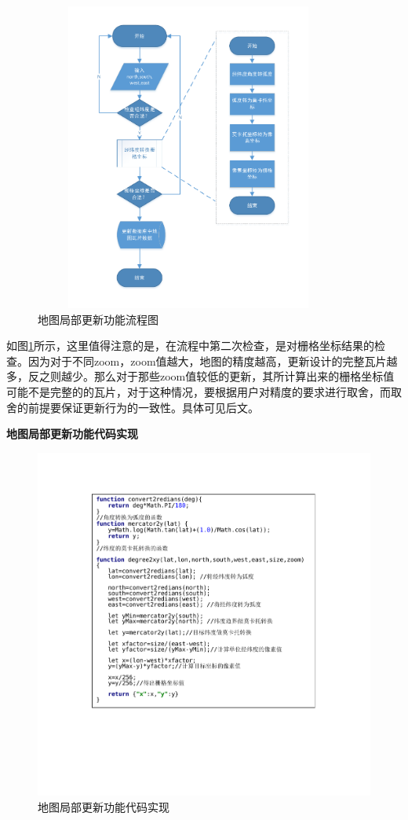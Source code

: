 \begin{figure}[H]
  \centering
  \includegraphics[width=4in,height=4in]{new_FIGs/chapter4/update_tile_1.pdf}
  \caption{地图局部更新功能流程图}\label{update_tile_1}
\end{figure}
如图\ref{update_tile_1}所示，这里值得注意的是，在流程中第二次检查，是对栅格坐标结果的检查。因为对于不同zoom，zoom值越大，地图的精度越高，更新设计的完整瓦片越多，反之则越少。那么对于那些zoom值较低的更新，其所计算出来的栅格坐标值可能不是完整的的瓦片，对于这种情况，要根据用户对精度的要求进行取舍，而取舍的前提要保证更新行为的一致性。具体可见后文。

\textbf{地图局部更新功能代码实现}

\begin{figure}[H]
  \centering
  \includegraphics[width=6in]{new_FIGs/chapter4/tile_degree_compute.pdf}
  \caption{地图局部更新功能代码实现}\label{tile_degree_compute}
\end{figure}


